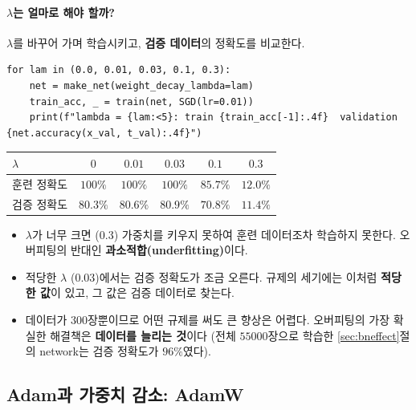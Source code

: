\documentclass[11pt,a4paper]{article}
\begin{document}
\paragraph{$\lambda$는 얼마로 해야 할까?}
$\lambda$를 바꾸어 가며 학습시키고, \textbf{검증 데이터}의 정확도를 비교한다.
\begin{lstlisting}
for lam in (0.0, 0.01, 0.03, 0.1, 0.3):
    net = make_net(weight_decay_lambda=lam)
    train_acc, _ = train(net, SGD(lr=0.01))
    print(f"lambda = {lam:<5}: train {train_acc[-1]:.4f}  validation {net.accuracy(x_val, t_val):.4f}")
\end{lstlisting}

\begin{center}
\begin{tabular}{@{}lccccc@{}}
\toprule
$\lambda$ & $0$ & $0.01$ & $0.03$ & $0.1$ & $0.3$ \\
\midrule
훈련 정확도 & $100\%$ & $100\%$ & $100\%$ & $85.7\%$ & $12.0\%$ \\
검증 정확도 & $80.3\%$ & $80.6\%$ & $\mathbf{80.9\%}$ & $70.8\%$ & $11.4\%$ \\
\bottomrule
\end{tabular}
\end{center}

\begin{itemize}[leftmargin=1.8em]
\item $\lambda$가 너무 크면 ($0.3$) 가중치를 키우지 못하여 훈련 데이터조차 학습하지 못한다.
오버피팅의 반대인 \textbf{과소적합(underfitting)}이다.
\item 적당한 $\lambda$ ($0.03$)에서는 검증 정확도가 조금 오른다.
규제의 세기에는 이처럼 \textbf{적당한 값}이 있고, 그 값은 검증 데이터로 찾는다.
\item 데이터가 $300$장뿐이므로 어떤 규제를 써도 큰 향상은 어렵다.
오버피팅의 가장 확실한 해결책은 \textbf{데이터를 늘리는 것}이다
(전체 $55000$장으로 학습한 \ref{sec:bneffect}절의 network는 검증 정확도가 $96\%$였다).
\end{itemize}

\subsection{Adam과 가중치 감소: AdamW}\label{sec:adamw}
\end{document}
